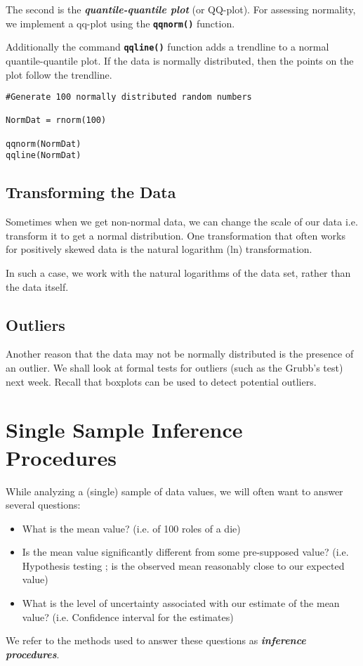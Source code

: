 The second is the \textbf{\emph{quantile-quantile plot}} (or QQ-plot).
For assessing normality, we implement a qq-plot  using the \texttt{\textbf{qqnorm()}} function.

Additionally the command \texttt{\textbf{qqline()}} function adds a trendline to a normal quantile-quantile plot. If the data is normally distributed, then the points on the plot follow the trendline.

\begin{framed}
\begin{verbatim}
#Generate 100 normally distributed random numbers

NormDat = rnorm(100)

qqnorm(NormDat)
qqline(NormDat)
\end{verbatim}
\end{framed}

\subsection{Transforming the Data}

Sometimes when we get non-normal data, we can change the scale of our data i.e. transform it to get a normal distribution. One transformation that often works for positively skewed data is the natural logarithm (ln) transformation.

In such a case, we work with the natural logarithms of the data set, rather than the data itself.
\subsection{Outliers}
Another reason that the data may not be normally distributed is the presence of an outlier. We shall look at formal tests for outliers (such as the Grubb's test) next week. Recall that boxplots can be used to detect potential outliers.

\section{Single Sample Inference Procedures}

While analyzing a (single) sample of data values, we will often want to answer several questions:
\begin{itemize}
\item	What is the mean value?  (i.e. of 100 roles of a die)
\item	Is the mean value significantly different from some pre-supposed value?
(i.e. Hypothesis testing ; is the observed mean reasonably close to our expected value)
\item	What is the level of uncertainty associated with our estimate of the mean value? (i.e. Confidence interval for the estimates)
\end{itemize}
We refer to the methods used to answer these questions as \textbf{\emph{inference procedures}}.

